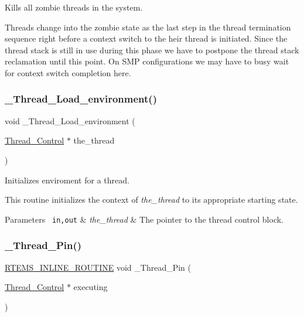 Kills all zombie threads in the system. 

Threads change into the zombie state as the last step in the thread termination sequence right before a context switch to the heir thread is initiated. Since the thread stack is still in use during this phase we have to postpone the thread stack reclamation until this point. On S\+MP configurations we may have to busy wait for context switch completion here. \mbox{\label{group__RTEMSScoreThread_gade10731d5bc6570cc485999da44acd43}} 
\subsubsection{\texorpdfstring{\_Thread\_Load\_environment()}{\_Thread\_Load\_environment()}}
{\footnotesize\ttfamily void \+\_\+\+Thread\+\_\+\+Load\+\_\+environment (\begin{DoxyParamCaption}\item[{\mbox{\hyperlink{struct__Thread__Control}{Thread\+\_\+\+Control}} $\ast$}]{the\+\_\+thread }\end{DoxyParamCaption})}



Initializes enviroment for a thread. 

This routine initializes the context of {\itshape the\+\_\+thread} to its appropriate starting state.


\begin{DoxyParams}[1]{Parameters}
\mbox{\texttt{ in,out}}  & {\em the\+\_\+thread} & The pointer to the thread control block. \\
\hline
\end{DoxyParams}
\mbox{\label{group__RTEMSScoreThread_gadfd1ad906bc42377d1c7b48aaba36c50}} 
\subsubsection{\texorpdfstring{\_Thread\_Pin()}{\_Thread\_Pin()}}
{\footnotesize\ttfamily \mbox{\hyperlink{group__RTEMSScoreBaseDefs_gac216239df231d5dbd15e3520b0b9313f}{R\+T\+E\+M\+S\+\_\+\+I\+N\+L\+I\+N\+E\+\_\+\+R\+O\+U\+T\+I\+NE}} void \+\_\+\+Thread\+\_\+\+Pin (\begin{DoxyParamCaption}\item[{\mbox{\hyperlink{struct__Thread__Control}{Thread\+\_\+\+Control}} $\ast$}]{executing }\end{DoxyParamCaption})}



